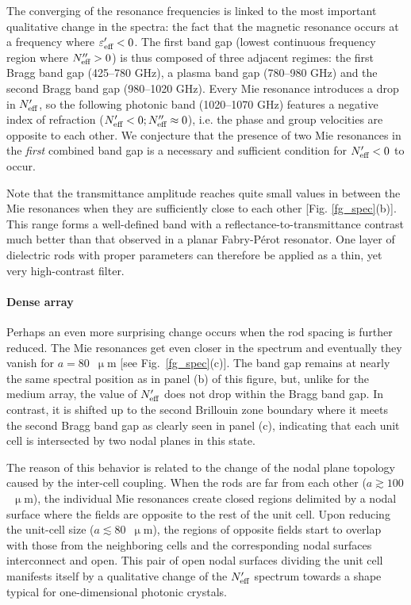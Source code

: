\documentclass[letterpaper,12pt]{report}
\begin{document}
The converging of the resonance frequencies is linked to the most important
qualitative change in the spectra: the fact that the magnetic resonance occurs at a
frequency where $\varepsilon_{\text{eff} }'<0$. The first band gap (lowest continuous frequency region where
$N_{\text{eff} }''>0$) is thus composed of three adjacent regimes: the first Bragg band gap
(425--780 GHz), a plasma band gap (780--980 GHz) and the second Bragg band gap (980--1020
GHz). Every Mie resonance introduces a drop in $N_{\text{eff} }'$, so the following photonic band
(1020--1070 GHz) features a negative index of refraction ($N_{\text{eff} }'<0; N_{\text{eff} }''\approx 0$),
i.e. the phase and group velocities are opposite to each other. We conjecture that the presence of two
Mie resonances in the \textit{first} combined band gap is a necessary and sufficient condition for
$N_{\text{eff} }'<0$ to occur.

Note that the transmittance amplitude reaches quite small values in between the Mie
resonances when they are sufficiently close to each other [Fig. \ref{fg_spec}(b)]. This range forms a
well-defined band with a reflectance-to-transmittance contrast much better than that
observed in a planar Fabry-P\'erot resonator. One layer of dielectric rods with proper
parameters can therefore be applied as a thin, yet very high-contrast filter.

\paragraph{Dense array}
Perhaps an even more surprising change occurs when the rod spacing is further reduced. The Mie resonances get even closer in the
spectrum and eventually they vanish for $a=80$~$\upmu$m [see Fig.~\ref{fg_spec}(c)]. The band gap remains at nearly the same spectral
position as in panel (b) of this figure, but, unlike for the medium array, the value of $N_{\text{eff} }'$ does not drop within
the Bragg band gap. In contrast, it is shifted up to the second Brillouin zone boundary
where it meets the second Bragg band gap as clearly seen in panel (c), indicating that
each unit cell is intersected by two nodal planes in this state.

The reason of this behavior is related to the change of the nodal plane topology caused
by the inter-cell coupling. When the rods are far from each other ($a\gtrsim
100$~$\upmu$m), the individual Mie resonances create closed regions delimited by a nodal
surface where the fields are opposite to the rest of the unit cell. Upon reducing the
unit-cell size ($a\lesssim 80$~$\upmu$m), the regions of opposite fields start to overlap
with those from the neighboring cells and the corresponding nodal surfaces interconnect
and open. This pair of open nodal surfaces dividing the unit cell manifests itself by a
qualitative change of the $N_{\text{eff} }'$ spectrum towards a shape typical for one-dimensional
photonic crystals.
\end{document}
